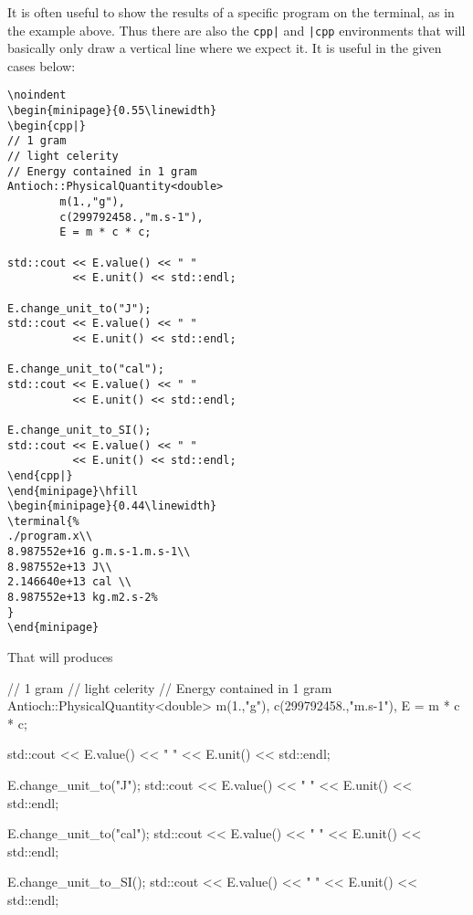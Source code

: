 \documentclass{documentation}
\begin{document}
It is often useful to show the results of a specific program
on the terminal, as in the example above. Thus there are
also the \verb!cpp|! and \verb!|cpp! environments that will
basically only draw a vertical line where we expect it. It
is useful in the given cases below:
\begin{multicols}{2}
\begin{verbatim}
\noindent
\begin{minipage}{0.55\linewidth}
\begin{cpp|} 
// 1 gram 
// light celerity
// Energy contained in 1 gram
Antioch::PhysicalQuantity<double> 
        m(1.,"g"),
        c(299792458.,"m.s-1"),
        E = m * c * c; 

std::cout << E.value() << " " 
          << E.unit() << std::endl;

E.change_unit_to("J");
std::cout << E.value() << " " 
          << E.unit() << std::endl;

E.change_unit_to("cal");
std::cout << E.value() << " " 
          << E.unit() << std::endl;

E.change_unit_to_SI();
std::cout << E.value() << " " 
          << E.unit() << std::endl;
\end{cpp|}
\end{minipage}\hfill
\begin{minipage}{0.44\linewidth}
\terminal{%
./program.x\\
8.987552e+16 g.m.s-1.m.s-1\\
8.987552e+13 J\\
2.146640e+13 cal \\
8.987552e+13 kg.m2.s-2%
}
\end{minipage}
\end{verbatim}
\end{multicols}
That will produces\\
\noindent
\begin{minipage}{0.55\linewidth}
\begin{cpp|} 
// 1 gram 
// light celerity
// Energy contained in 1 gram
Antioch::PhysicalQuantity<double> 
        m(1.,"g"),
        c(299792458.,"m.s-1"),
        E = m * c * c; 

std::cout << E.value() << " " 
          << E.unit() << std::endl;

E.change_unit_to("J");
std::cout << E.value() << " " 
          << E.unit() << std::endl;

E.change_unit_to("cal");
std::cout << E.value() << " " 
          << E.unit() << std::endl;

E.change_unit_to_SI();
std::cout << E.value() << " " 
          << E.unit() << std::endl;
\end{cpp|}
\end{minipage}\hfill
\begin{minipage}{0.44\linewidth}
\end{minipage}
\end{document}
